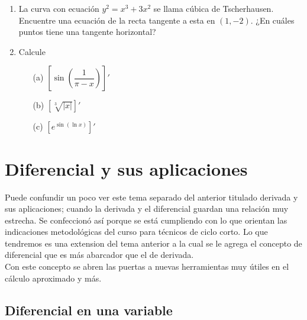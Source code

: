 \documentclass[10pt,twoside]{SelfArx} %
\begin{document}
\begin{enumerate}
	\item	La curva con ecuación $ y^{2}=x^{3}+3x^{2} $ se llama cúbica de Tscherhausen. Encuentre una ecuación de la recta tangente a esta en $ (1,-2) $. ¿En cuáles puntos tiene una tangente horizontal?
	
	\item	Calcule
	\begin{enumerate}
		\item[(a)]	$ \left [ \sin\left (\dfrac{1}{\pi-x}\right )\right ]' $
		\item[(b)]	$ \left [ \sqrt[3]{|x|}\right ]' $
		
		\item[(c)]	$ \left [ e^{\sin(\ln x)}\right ]' $
	\end{enumerate}
	
	
\end{enumerate}

\newpage
 \section{Diferencial y sus aplicaciones}
 Puede confundir un poco ver este tema separado del anterior titulado derivada y sus aplicaciones; cuando la derivada y el diferencial guardan una relación muy estrecha. Se confeccionó así porque se está cumpliendo con lo que orientan las indicaciones metodológicas del curso para técnicos de ciclo corto. Lo que tendremos es una extension del tema anterior a la cual se le agrega el concepto de diferencial que es más abarcador que el de derivada.\\
 Con este concepto se abren las puertas a nuevas herramientas muy \'utiles  en el cálculo aproximado y más.
 
 
 




 \subsection{Diferencial en una variable}
  
\end{document}
